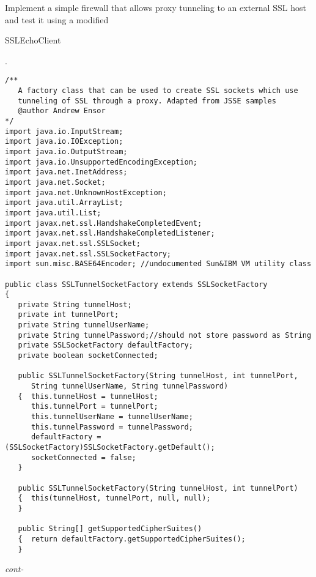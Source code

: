\begin{exercise}
	Implement a simple firewall that allows proxy tunneling to an external SSL host
	and test it using a modified \begin{code}SSLEchoClient\end{code}.
\end{exercise}


\begin{figure*}\begin{program}\begin{verbatim}
/**
   A factory class that can be used to create SSL sockets which use
   tunneling of SSL through a proxy. Adapted from JSSE samples
   @author Andrew Ensor
*/
import java.io.InputStream;
import java.io.IOException;
import java.io.OutputStream;
import java.io.UnsupportedEncodingException;
import java.net.InetAddress;
import java.net.Socket;
import java.net.UnknownHostException;
import java.util.ArrayList;
import java.util.List;
import javax.net.ssl.HandshakeCompletedEvent;
import javax.net.ssl.HandshakeCompletedListener;
import javax.net.ssl.SSLSocket;
import javax.net.ssl.SSLSocketFactory;
import sun.misc.BASE64Encoder; //undocumented Sun&IBM VM utility class

public class SSLTunnelSocketFactory extends SSLSocketFactory
{
   private String tunnelHost;
   private int tunnelPort;
   private String tunnelUserName;
   private String tunnelPassword;//should not store password as String
   private SSLSocketFactory defaultFactory;
   private boolean socketConnected;

   public SSLTunnelSocketFactory(String tunnelHost, int tunnelPort,
      String tunnelUserName, String tunnelPassword)
   {  this.tunnelHost = tunnelHost;
      this.tunnelPort = tunnelPort;
      this.tunnelUserName = tunnelUserName;
      this.tunnelPassword = tunnelPassword;
      defaultFactory = (SSLSocketFactory)SSLSocketFactory.getDefault();
      socketConnected = false;
   }

   public SSLTunnelSocketFactory(String tunnelHost, int tunnelPort)
   {  this(tunnelHost, tunnelPort, null, null);
   }

   public String[] getSupportedCipherSuites()
   {  return defaultFactory.getSupportedCipherSuites();
   }
\end{verbatim}\hfill \emph{cont-}\end{program}\end{figure*}%

